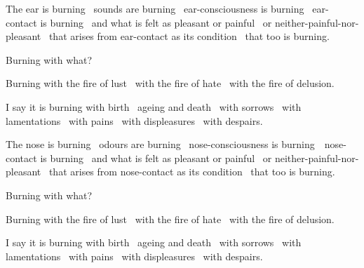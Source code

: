 \begin{english-only-hang}
  The ear is burning \breathmark\ sounds are burning \breathmark\ ear-consciousness is burning \breathmark\ ear-contact is burning \breathmark\ and what is felt as pleasant or painful \breathmark\ or neither-painful-nor-pleasant \breathmark\ that arises from ear-contact as its condition \breathmark\ that too is burning.
\end{english-only-hang}

\begin{english-only-hang}
  Burning with what?
\end{english-only-hang}

\begin{english-only-hang}
  Burning with the fire of lust \breathmark\ with the fire of hate \breathmark\ with the fire of delusion.
\end{english-only-hang}

\begin{english-only-hang}
  I say it is burning with birth \breathmark\ ageing and death \breathmark\ with sorrows \breathmark\ with lamentations \breathmark\ with pains \breathmark\ with displeasures \breathmark\ with despairs.
\end{english-only-hang}

\begin{english-only-hang}
  The nose is burning \breathmark\ odours are burning \breathmark\ nose-consciousness is \mbox{burning}~\breathmark\ nose-contact is burning \breathmark\ and what is felt as pleasant or painful \breathmark\ or neither-painful-nor-pleasant \breathmark\ that arises from nose-contact as its condition \breathmark\ that too is burning.
\end{english-only-hang}

\begin{english-only-hang}
  Burning with what?
\end{english-only-hang}

\begin{english-only-hang}
  Burning with the fire of lust \breathmark\ with the fire of hate \breathmark\ with the fire of delusion.
\end{english-only-hang}

\begin{english-only-hang}
  I say it is burning with birth \breathmark\ ageing and death \breathmark\ with sorrows \breathmark\ with lamentations \breathmark\ with pains \breathmark\ with displeasures \breathmark\ with despairs.
\end{english-only-hang}

